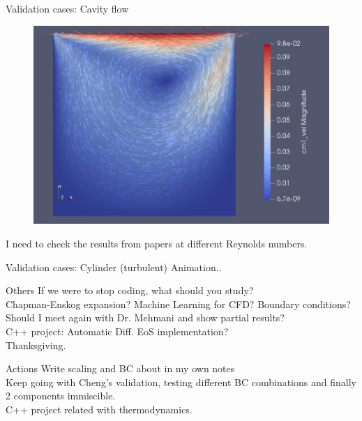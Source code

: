 \documentclass{beamer}
\begin{document}
	\begin{frame}{Validation cases: Cavity flow}
		\begin{figure}
			\includegraphics[scale=0.18]{pics/cavity.png}
		\end{figure}
	I need to check the results from papers at different Reynolds numbers.
	\end{frame}

	\begin{frame}{Validation cases: Cylinder (turbulent)}
		Animation..
	\end{frame}

	\begin{frame}{Others}
		If we were to stop coding, what should you study?\\
		Chapman-Enskog expansion? Machine Learning for CFD? Boundary conditions?\\
		Should I meet again with Dr. Mehmani and show partial results?\\
		C++ project: Automatic Diff. EoS implementation?\\
		Thanksgiving.
	\end{frame}

	\begin{frame}{Actions}
		Write scaling and BC about in my own notes\\
		Keep going with Cheng's validation, testing different BC combinations and finally 2 components immiscible.\\
		C++ project related with thermodynamics. 
	\end{frame}
	
\end{document}
